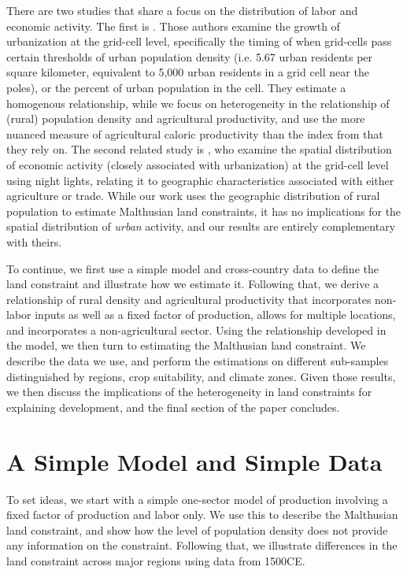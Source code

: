\documentclass[11pt]{article}
\begin{document}
There are two studies that share a focus on the distribution of labor and economic activity. The first is \citet{mfm2014}. Those authors examine the growth of urbanization at the grid-cell level, specifically the timing of when grid-cells pass certain thresholds of urban population density (i.e. 5.67 urban residents per square kilometer, equivalent to 5,000 urban residents in a grid cell near the poles), or the percent of urban population in the cell. They estimate a homogenous relationship, while we focus on heterogeneity in the relationship of (rural) population density and agricultural productivity, and use the more nuanced measure of agricultural caloric productivity than the index from \citet{ramankutty2002} that they rely on. The second related study is \citet{hssw2016}, who examine the spatial distribution of economic activity (closely associated with urbanization) at the grid-cell level using night lights, relating it to geographic characteristics associated with either agriculture or trade. While our work uses the geographic distribution of rural population to estimate Malthusian land constraints, it has no implications for the spatial distribution of \textit{urban} activity, and our results are entirely complementary with theirs.

To continue, we first use a simple model and cross-country data to define the land constraint and illustrate how we estimate it. Following that, we derive a relationship of rural density and agricultural productivity that incorporates non-labor inputs as well as a fixed factor of production, allows for multiple locations, and incorporates a non-agricultural sector. Using the relationship developed in the model, we then turn to estimating the Malthusian land constraint. We describe the data we use, and perform the estimations on different sub-samples distinguished by regions, crop suitability, and climate zones. Given those results, we then discuss the implications of the heterogeneity in land constraints for explaining development, and the final section of the paper concludes.

\section{A Simple Model and Simple Data}
To set ideas, we start with a simple one-sector model of production involving a fixed factor of production and labor only. We use this to describe the Malthusian land constraint, and show how the level of population density does not provide any information on the constraint. Following that, we illustrate differences in the land constraint across major regions using data from 1500CE. 
\end{document}
